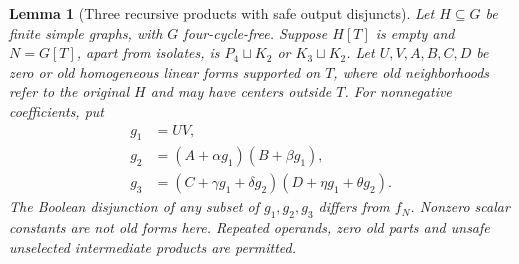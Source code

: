 \documentclass[11pt]{article}
\newtheorem{lemma}[theorem]{Lemma}
\theoremstyle{definition}
\theoremstyle{remark}
\begin{document}
\begin{lemma}[Three recursive products with safe output disjuncts]\label{lem:recursivesafeoutputs}
Let $H\subseteq G$ be finite simple graphs, with $G$ four-cycle-free. Suppose $H[T]$ is empty and $N=G[T]$, apart from isolates, is $P_4\sqcup K_2$ or $K_3\sqcup K_2$. Let $U,V,A,B,C,D$ be zero or old homogeneous linear forms supported on $T$, where old neighborhoods refer to the original $H$ and may have centers outside $T$. For nonnegative coefficients, put
\[
\begin{split}
 g_1&=UV,\\
 g_2&=(A+\alpha g_1)(B+\beta g_1),\\
 g_3&=(C+\gamma g_1+\delta g_2)(D+\eta g_1+\theta g_2).
\end{split}
\]
The Boolean disjunction of any subset of $g_1,g_2,g_3$ differs from $f_N$. Nonzero scalar constants are not old forms here. Repeated operands, zero old parts and unsafe unselected intermediate products are permitted.
\end{lemma}
\end{document}
